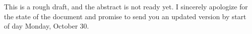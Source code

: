 This is a rough draft, and the abstract is not ready yet.
I sincerely apologize for the state of the document and promise to send you an updated version by start of day Monday, October 30.